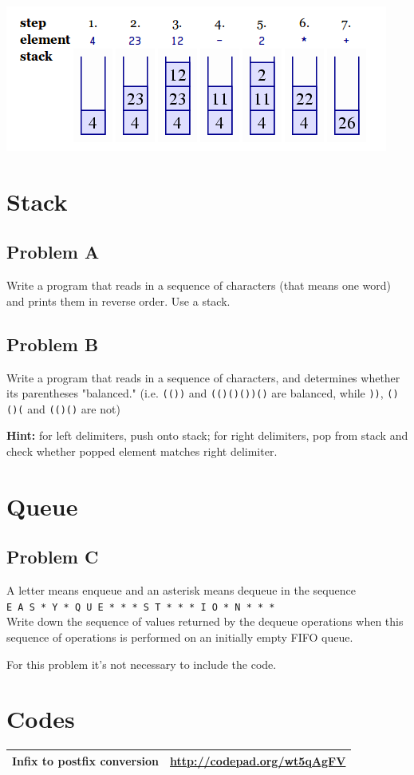 \documentclass[a4paper, 11pt]{article}
\begin{document}
\includegraphics{image.png}


\section{Stack}
\subsection{Problem A}
Write a program that reads in a sequence of characters (that means one word) and prints them in reverse order. Use a stack.  

\subsection{Problem B}
Write a program that reads in a sequence of characters, and determines whether its parentheses "balanced." (i.e. \verb|(())| and \verb|(()()())()| are balanced, while \verb|))|, \verb|()()(| and \verb|(()()| are not)

\textbf{Hint:} for left delimiters, push onto stack; for right delimiters, pop from stack and check whether popped element matches right delimiter. 

\section{Queue}

\subsection{Problem C}
A letter means enqueue and an asterisk means dequeue in the sequence \\ 
\verb|E A S * Y * Q U E * * * S T * * * I O * N * * *| \\Write down the sequence of values returned by the dequeue operations when this sequence of operations is performed on an initially empty FIFO queue.

For this problem it's not necessary to include the code.

\section{Codes}

\begin{tabular}{|c|c|}
\hline
Infix to postfix conversion & \url{http://codepad.org/wt5qAgFV} \\ \hline
\end{tabular}
\end{document}
